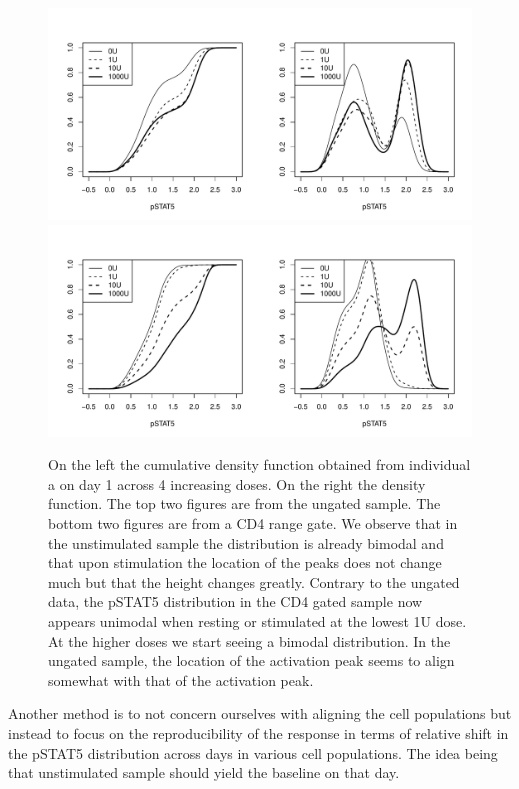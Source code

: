 \begin{figure}[h]
    \centering
    \includegraphics[scale=.5]{IL2/figures/ungated-dose-effect.pdf}
    \includegraphics[scale=.5]{IL2/figures/lymph-dose-effect.pdf}
    \caption{  \label{figure:dose-effect}
        On the left the cumulative density function obtained from individual a on day 1 across 4 increasing doses.
        On the right the density function.
        The top two figures are from the ungated sample.
        The bottom two figures are from a CD4 range gate.
        We observe that in the unstimulated sample the distribution is already bimodal 
        and that upon stimulation the location of the peaks does not change much but that the height changes greatly.
        Contrary to the ungated data, the pSTAT5 distribution in the CD4 gated sample now appears unimodal when resting or stimulated
        at the lowest 1U dose.  At the higher doses we start seeing a bimodal distribution.
        In the ungated sample, the location of the activation peak seems to align somewhat with that of the activation peak.  }
\end{figure}

Another method is to not concern ourselves with aligning the cell populations but instead to focus on the reproducibility of the response in terms of relative shift in the pSTAT5 distribution across days in various cell populations.
The idea being that unstimulated sample should yield the baseline on that day.

